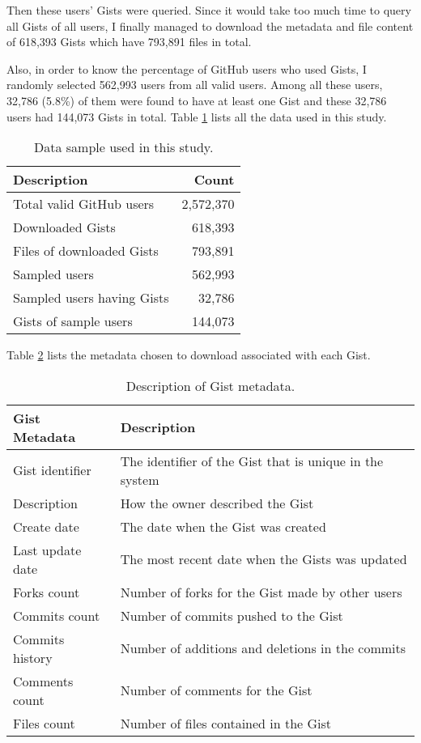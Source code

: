 Then these users' Gists were queried. Since it would take too much time to query all Gists of all users, I finally managed to download the metadata and file content of 618,393 Gists which have 793,891 files in total. 

Also, in order to know the percentage of GitHub users who used Gists, I randomly selected 562,993 users from all valid users. Among all these users, 32,786 (5.8\%) of them were found to have at least one Gist and these 32,786 users had 144,073 Gists in total. Table \ref{tb:data} lists all the data used in this study. 

\begin{table}[!htb]
 \begin{center}
 \begin{tabular}{@{}lr} 
    \textbf{Description}                &   \textbf{Count}\\ \hline
    Total valid GitHub users      &   2,572,370\\
    Downloaded Gists              &   618,393\\
    \quad Files of downloaded Gists     &   793,891\\
    Sampled users                 &   562,993\\
    \quad Sampled users having Gists & 32,786\\
    \quad Gists of sample users & 144,073\\ \hline
 \end{tabular}
 \end{center}
 \caption{Data sample used in this study.}
 \label{tb:data}
\end{table}

Table \ref{tb:gistmetadata} lists the metadata chosen to download associated with each Gist. 
\begin{table}[!htb]
 \begin{center}
 \begin{tabular}{@{}ll} 
    \textbf{Gist Metadata}	&	\textbf{Description}\\ \hline
    Gist identifier	&	The identifier of the Gist that is unique in the system\\
	Description	&	How the owner described the Gist\\
	Create date & The date when the Gist was created\\
	Last update date & The most recent date when the Gists was updated\\
	Forks count & Number of forks for the Gist made by other users\\
	Commits count & Number of commits pushed to the Gist\\
	Commits history & Number of additions and deletions in the commits\\
	Comments count & Number of comments for the Gist\\
	Files count & Number of files contained in the Gist\\ \hline
 \end{tabular}
 \end{center}
 \caption{Description of Gist metadata.}
 \label{tb:gistmetadata}
\end{table}

